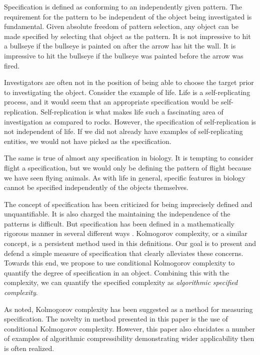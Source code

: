 Specification is defined as conforming to an independently given pattern.
The requirement for the pattern to be independent of the object being investigated is fundamental.
Given absolute freedom of pattern selection, any object can be made specified by selecting that object as the pattern.
It is not impressive to hit a bullseye if the bullseye is painted on after the arrow has hit the wall.
It is impressive to hit the bullseye if the bullseye was painted before the arrow was fired.

Investigators are often not in the position of being able to choose the target prior to investigating the object.
Consider the example of life.
Life is a self-replicating process, and it would seem that an appropriate specification would be self-replication.
Self-replication is what makes life such a fascinating area of investigation as compared to rocks.
However, the specification of self-replication is not independent of life.
If we did not already have examples of self-replicating entities, we would not have picked as the specification.

The same is true of almost any specification in biology.
It is tempting to consider flight a specification, but we would only be defining the pattern of flight because we have seen flying animals.
As with life in general, specific features in biology cannot be specified independently of the objects themselves.

The concept of specification has been criticized for being imprecisely defined and unquantifiable.
It is also charged the maintaining the independence of the patterns is difficult.
But specification has been defined in a mathematically rigorous manner in several different ways \cite{Dembski1998, Dembski2002, Dembski2005a}.
Kolmogorov complexity, or a similar concept, is a persistent method used in this definitions.
Our goal is to present and defend a simple measure of specification that clearly alleviates these concerns.
Towards this end, we propose to use conditional Kolmogorov complexity to quantify the degree of specification in an object.
Combining this with the complexity, we can quantify the specified complexity as \textit{algorithmic specified complexity}.

As noted, Kolmogorov complexity has been suggested as a method for measuring specification.
The novelty in method presented in this paper is the use of conditional Kolmogorov complexity.
However, this paper also elucidates a number of examples of algorithmic compressibility demonstrating wider applicability then is often realized.

